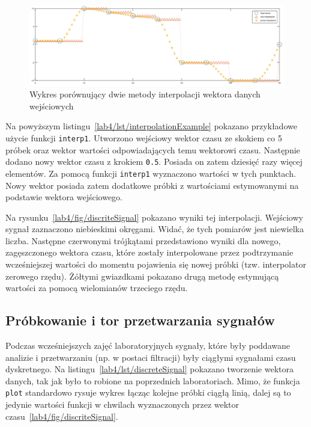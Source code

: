 \begin{figure}[hbt!]
	\centering
	\includegraphics[width=0.95\linewidth]{images/interpolationExample.png}
	\caption{Wykres porównujący dwie metody interpolacji wektora danych wejściowych}
	\label{lab4/fig/interpolationExample}
\end{figure}

Na powyższym listingu~\ref{lab4/lst/interpolationExample} pokazano przykładowe użycie funkcji \texttt{interp1}. Utworzono wejściowy wektor czasu ze skokiem co 5 próbek oraz wektor wartości odpowiadających temu wektorowi czasu. Następnie dodano nowy wektor czasu z krokiem \texttt{0.5}. Posiada on zatem dziesięć razy więcej elementów. Za pomocą funkcji \texttt{interp1} wyznaczono wartości w tych punktach. Nowy wektor posiada zatem dodatkowe próbki z wartościami estymowanymi na podstawie wektora wejściowego.

Na rysunku~\ref{lab4/fig/discriteSignal} pokazano wyniki tej interpolacji. Wejściowy sygnał zaznaczono niebieskimi okręgami. Widać, że tych pomiarów jest niewielka liczba. Następne czerwonymi trójkątami przedstawiono wyniki dla nowego, zagęszczonego wektora czasu, które zostały interpolowane przez podtrzymanie wcześniejszej wartości do momentu pojawienia się nowej próbki (tzw. interpolator zerowego rzędu). Żółtymi gwiazdkami pokazano drugą metodę estymującą wartości za pomocą wielomianów trzeciego rzędu.




\subsection{Próbkowanie i tor przetwarzania sygnałów}
Podczas wcześniejszych zajęć laboratoryjnych sygnały, które były poddawane analizie i przetwarzaniu (np. w postaci filtracji) były ciągłymi sygnałami czasu dyskretnego. Na listingu~\ref{lab4/lst/discreteSignal} pokazano tworzenie wektora danych, tak jak było to robione na poprzednich laboratoriach. Mimo, że funkcja \texttt{plot} standardowo rysuje wykres łącząc kolejne próbki ciągłą linią, dalej są to jedynie wartości funkcji w chwilach wyznaczonych przez wektor czasu~\ref{lab4/fig/discriteSignal}. 

